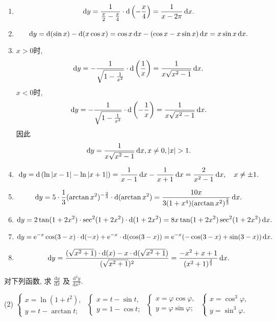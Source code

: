 \begin{solution}
    \begin{enumerate}
        \item $$\operatorname{d\!} y = \frac{1}{\frac{\pi}{2}-\frac{x}{4}} \cdot \operatorname{d}\left( -\frac{x}{4} \right) = \frac{1}{x - 2\pi} \operatorname{d\!} x.$$
        \item $$\operatorname{d\!} y = \operatorname{d}(\sin x) - \operatorname{d}(x\cos x) = \cos x \operatorname{d\!} x - (\cos x - x\sin x) \operatorname{d\!} x = x\sin x \operatorname{d\!} x.$$
        \item $x > 0$时, $$\operatorname{d\!} y = -\frac{1}{\sqrt{1-\frac{1}{x^2}}} \cdot \operatorname{d}\left( \frac{1}{x} \right) = \frac{1}{x\sqrt{x^2-1}} \operatorname{d\!} x.$$
              $x < 0$时, $$\operatorname{d\!} y = -\frac{1}{\sqrt{1-\frac{1}{x^2}}} \cdot \operatorname{d}\left( -\frac{1}{x} \right) = \frac{1}{x\sqrt{x^2-1}} \operatorname{d\!} x.$$
              因此$$\operatorname{d\!} y = \frac{1}{x\sqrt{x^2-1}} \operatorname{d\!} x, x \neq 0, |x| > 1.$$
        \item $$\operatorname{d\!} y = \operatorname{d}\left( \ln|x-1| - \ln|x+1| \right) = \frac{1}{x-1} \operatorname{d\!} x - \frac{1}{x+1} \operatorname{d\!} x = \frac{2}{x^2-1} \operatorname{d\!} x, \quad x \neq \pm 1.$$
        \item $$\operatorname{d\!} y = 5 \cdot \frac{1}{3} (\arctan x^2)^{-\frac{2}{3}} \cdot \operatorname{d}(\arctan x^2) = \frac{10x}{3(1+x^4)(\arctan x^2)^{\frac{2}{3}}} \operatorname{d\!} x.$$
        \item $$\operatorname{d\!} y = 2\tan(1+2x^2) \cdot \sec^2(1+2x^2) \cdot \operatorname{d}(1+2x^2) = 8x \tan(1+2x^2) \sec^2(1+2x^2) \operatorname{d\!} x.$$
        \item $$\operatorname{d\!} y = \mathrm{e}^{-x} \cos(3-x) \cdot \operatorname{d}(-x) + \mathrm{e}^{-x} \cdot \operatorname{d}(\cos(3-x)) = \mathrm{e}^{-x} (-\cos(3-x) + \sin(3-x)) \operatorname{d\!} x.$$
        \item $$\operatorname{d\!} y = \frac{(\sqrt{x^2+1}) \cdot \operatorname{d}(x) - x \cdot \operatorname{d}(\sqrt{x^2+1})}{(\sqrt{x^2+1})^2} = \frac{-x^2+x+1}{(x^2+1)^{\frac32}} \operatorname{d\!} x.$$
    \end{enumerate}
\end{solution}

\begin{exercise}[3.2.3]
    对下列函数, 求 $\frac{\mathrm{d}y}{\mathrm{d}x}$ 及 $\frac{\mathrm{d}^2y}{\mathrm{d}x^2}$.
    \begin{tasks}[label=(\arabic*)](2)
        \task $\begin{cases} x=\ln(1+t^2), \\ y=t-\arctan t; \end{cases}$
        \task $\begin{cases} x=t-\sin t, \\ y=1-\cos t; \end{cases}$
        \task $\begin{cases} x=\varphi\cos\varphi, \\ y=\varphi\sin\varphi; \end{cases}$
        \task $\begin{cases} x=\cos^3\varphi, \\ y=\sin^3\varphi. \end{cases}$
    \end{tasks}
\end{exercise}

